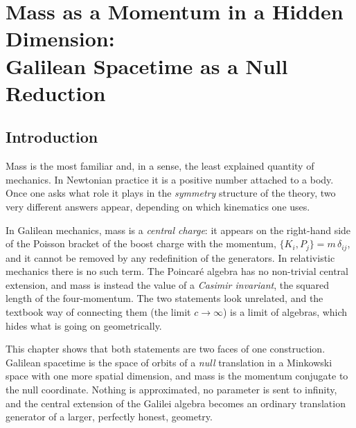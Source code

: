 %

\theoremstyle{plain}
\newtheorem{nrprop}{Proposition}[chapter]
\theoremstyle{definition}
\newtheorem{nrdef}[nrprop]{Definition}
\theoremstyle{remark}
\newtheorem{nrrem}[nrprop]{Remark}
\theoremstyle{plain}

\chapter[Mass as a Momentum in a Hidden Dimension]{Mass as a Momentum in a Hidden Dimension:\\ Galilean Spacetime as a Null Reduction}
\label{ch:nr}

\section{Introduction}

Mass is the most familiar and, in a sense, the least explained quantity of
mechanics. In Newtonian practice it is a positive number attached to a body.
Once one asks what role it plays in the \emph{symmetry} structure of the
theory, two very different answers appear, depending on which kinematics one
uses.

In Galilean mechanics, mass is a \emph{central charge}: it appears on the
right-hand side of the Poisson bracket of the boost charge with the momentum,
$\{K_i,P_j\}=m\,\delta_{ij}$, and it cannot be removed by any redefinition of
the generators. In relativistic mechanics there is no such term. The
Poincar\'e algebra has no non-trivial central extension, and mass is instead
the value of a \emph{Casimir invariant}, the squared length of the
four-momentum. The two statements look unrelated, and the textbook way of
connecting them (the limit $c\to\infty$) is a limit of algebras, which hides
what is going on geometrically.

This chapter shows that both statements are two faces of one construction.
Galilean spacetime is the space of orbits of a \emph{null} translation in a
Minkowski space with one more spatial dimension, and mass is the momentum
conjugate to the null coordinate. Nothing is approximated, no parameter is sent
to infinity, and the central extension of the Galilei algebra becomes an
ordinary translation generator of a larger, perfectly honest, geometry.

